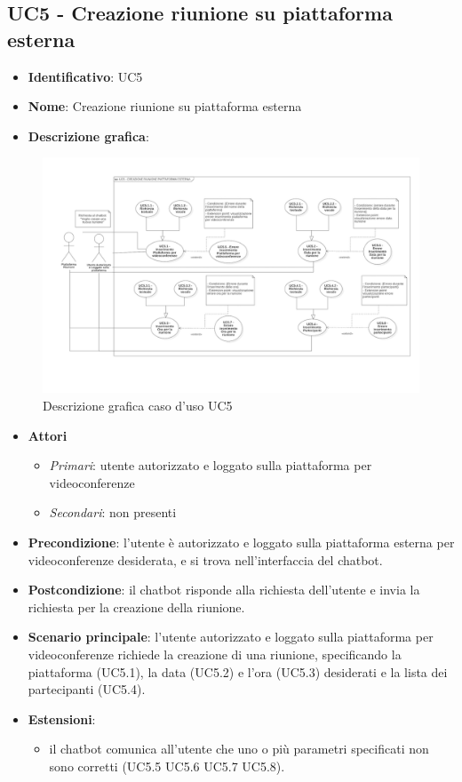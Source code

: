\subsection{UC5 - Creazione riunione su piattaforma esterna}
\begin{itemize}
    \item \textbf{Identificativo}: UC5
    \item \textbf{Nome}: Creazione riunione su piattaforma esterna
    \item \textbf{Descrizione grafica}:
\end{itemize}

\begin{figure}[h]
   \centering
   \includegraphics[scale=0.9]{images/UC5.png} 
   \caption{Descrizione grafica caso d'uso UC5}
\end{figure}

 \begin{itemize}
    \item \textbf{Attori}
 \begin{itemize} 
    \item \textit{Primari}: utente autorizzato e loggato sulla piattaforma per videoconferenze
    \item \textit{Secondari}: non presenti
 \end{itemize}
 \item \textbf{Precondizione}: l'utente è autorizzato e loggato sulla piattaforma esterna per videoconferenze desiderata, e si trova nell'interfaccia del chatbot.
 \item \textbf{Postcondizione}: il chatbot risponde alla richiesta dell'utente e invia la richiesta per la creazione della riunione.
 \item \textbf{Scenario principale}: l'utente autorizzato e loggato sulla piattaforma per videoconferenze richiede la creazione di una riunione, specificando la piattaforma (UC5.1), la data (UC5.2) e l'ora (UC5.3) desiderati e la lista dei partecipanti (UC5.4).
 \item \textbf{Estensioni}: 
 \begin{itemize} 
    \item il chatbot comunica all'utente che uno o più parametri specificati non sono corretti (UC5.5 UC5.6 UC5.7 UC5.8).
 \end{itemize}
\end{itemize}
\newpage

